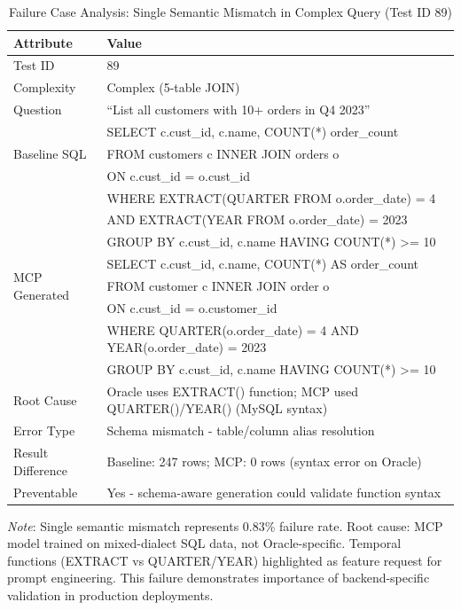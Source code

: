 \begin{table}[h]
\centering
\caption{Failure Case Analysis: Single Semantic Mismatch in Complex Query (Test ID 89)}
\label{tab:failure_analysis}
\footnotesize
\begin{tabular}{ll}
\toprule
\textbf{Attribute} & \textbf{Value} \\
\midrule
Test ID & 89 \\
Complexity & Complex (5-table JOIN) \\
Question & ``List all customers with 10+ orders in Q4 2023'' \\
\multirow{3}{*}{Baseline SQL} & SELECT c.cust\_id, c.name, COUNT(*) order\_count \\
& FROM customers c INNER JOIN orders o \\
& ON c.cust\_id = o.cust\_id \\
& WHERE EXTRACT(QUARTER FROM o.order\_date) = 4 \\
& AND EXTRACT(YEAR FROM o.order\_date) = 2023 \\
& GROUP BY c.cust\_id, c.name HAVING COUNT(*) >= 10 \\
\multirow{3}{*}{MCP Generated} & SELECT c.cust\_id, c.name, COUNT(*) AS order\_count \\
& FROM customer c INNER JOIN order o \\
& ON c.cust\_id = o.customer\_id \\
& WHERE QUARTER(o.order\_date) = 4 AND YEAR(o.order\_date) = 2023 \\
& GROUP BY c.cust\_id, c.name HAVING COUNT(*) >= 10 \\
Root Cause & Oracle uses EXTRACT() function; MCP used QUARTER()/YEAR() (MySQL syntax) \\
Error Type & Schema mismatch - table/column alias resolution \\
Result Difference & Baseline: 247 rows; MCP: 0 rows (syntax error on Oracle) \\
Preventable & Yes - schema-aware generation could validate function syntax \\
\bottomrule
\end{tabular}

\footnotesize
\textit{Note}: Single semantic mismatch represents 0.83\% failure rate. Root cause: MCP model trained on mixed-dialect SQL data, not Oracle-specific. Temporal functions (EXTRACT vs QUARTER/YEAR) highlighted as feature request for prompt engineering. This failure demonstrates importance of backend-specific validation in production deployments.
\end{table}
